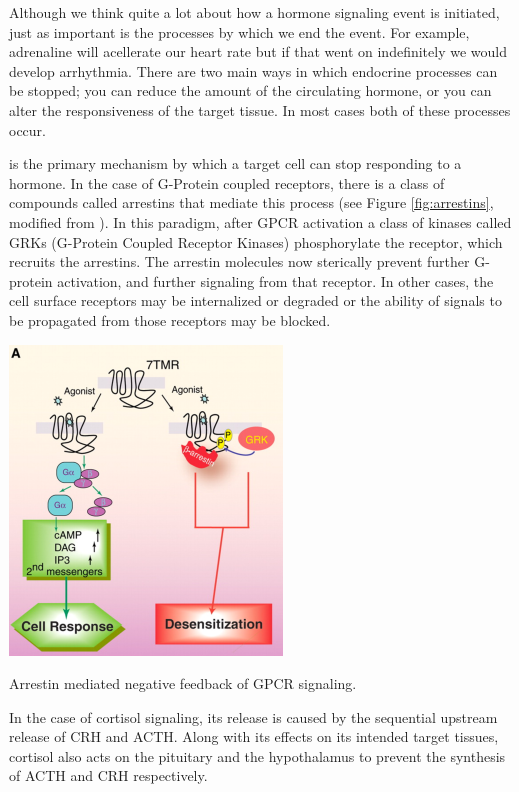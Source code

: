 \documentclass{tufte-handout}
\begin{document}
Although we think quite a lot about how a hormone signaling event is initiated, just as important is the processes by which we end the event.  For example, adrenaline will acellerate our heart rate but if that went on indefinitely we would develop arrhythmia.  There are two main ways in which endocrine processes can be stopped;  you can reduce the amount of the circulating hormone, or you can alter the responsiveness of the target tissue.  In most cases both of these processes occur.

 is the primary mechanism by which a target cell can stop responding to a hormone.  In the case of G-Protein coupled receptors, there is a class of compounds called arrestins that mediate this process (see Figure \ref{fig:arrestins}, modified from \cite{Lefkowitz2005}).  In this paradigm, after GPCR activation a class of kinases called GRKs (G-Protein Coupled Receptor Kinases) phosphorylate the receptor, which recruits the arrestins.  The arrestin molecules now sterically prevent further G-protein activation, and further signaling from that receptor.  In other cases, the cell surface receptors may be internalized or degraded or the ability of signals to be propagated from those receptors may be blocked.

\begin{marginfigure}[-13cm]
  \includegraphics{figures/arrestins}
  \caption{Arrestin mediated negative feedback of GPCR signaling.}
    \label{fig:arrestins}
\end{marginfigure}

  In the case of cortisol signaling, its release is caused by the sequential upstream release of CRH and ACTH.  Along with its effects on its intended target tissues, cortisol also acts on the pituitary and the hypothalamus to prevent the synthesis of ACTH and CRH respectively.  
\end{document}
